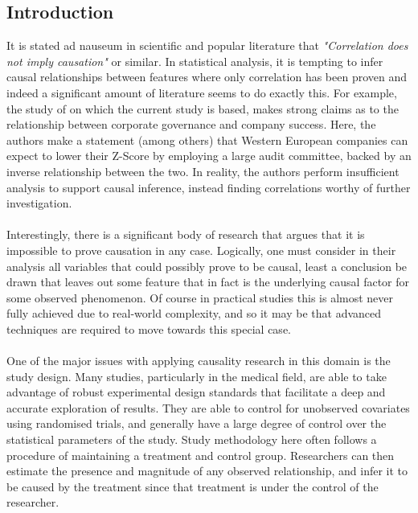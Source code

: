 {\subsection{Introduction}
{It is stated ad nauseum in scientific and popular literature that {\it "Correlation does not imply causation"} or similar. In statistical analysis, it is tempting to infer causal relationships between features where only correlation has been proven and indeed a significant amount of literature seems to do exactly this. For example, the study of \cite{moldovan2015learning} on which the current study is based, makes strong claims as to the relationship between corporate governance and company success. Here, the authors make a statement (among others) that Western European companies can expect to lower their Z-Score by employing a large audit committee, backed by an inverse relationship between the two. In reality, the authors perform insufficient analysis to support causal inference, instead finding correlations worthy of further investigation. \\\\
Interestingly, there is a significant body of research that argues that it is impossible to prove causation in any case. Logically, one must consider in their analysis all variables that could possibly prove to be causal, least a conclusion be drawn that leaves out some feature that in fact is the underlying causal factor for some observed phenomenon. Of course in practical studies this is almost never fully achieved due to real-world complexity, and so it may be that advanced techniques are required to move towards this special case.  \\\\
One of the major issues with applying causality research in this domain is the study design. Many studies, particularly in the medical field, are able to take advantage of robust experimental design standards that facilitate a deep and accurate exploration of results. They are able to control for unobserved covariates using randomised trials, and generally have a large degree of control over the statistical parameters of the study. Study methodology here often follows a procedure of maintaining a treatment and control group. Researchers can then estimate the presence and magnitude of any observed relationship, and infer it to be caused by the treatment since that treatment is under the control of the researcher.  \\\\
}}
